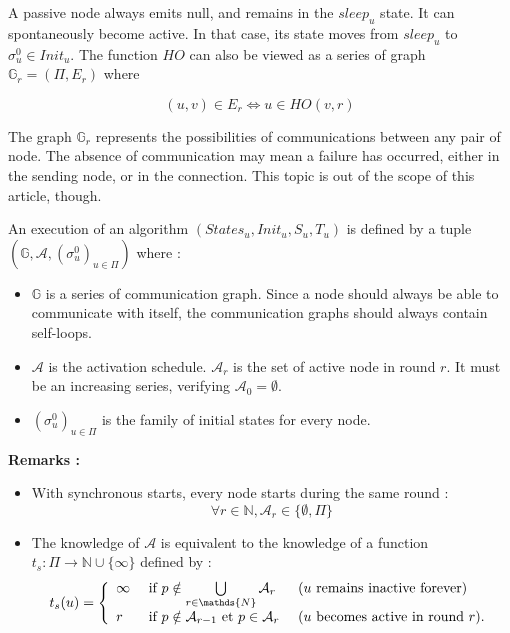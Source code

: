 \documentclass{article}
\newcommand{\ts}{t_{s}}
\begin{document}
A passive node always emits null, and remains in the $sleep_u$ state.
It can spontaneously become active. In that case, its state moves from $sleep_u$ to $\sigma^0_u \in Init_u$.
The function $HO$ can also be viewed as a series of graph $\mathds{G}_r = (\Pi, E_r)$ where

$$(u, v) \in E_r \Leftrightarrow u \in HO(v, r)$$

The graph $\mathds{G}_r$ represents the possibilities of communications between any pair of node.
The absence of communication may mean a failure has occurred, either in the sending node, or in the connection.
This topic is out of the scope of this article, though.

An execution of an algorithm $(States_u, Init_u, S_u, T_u)$ is defined by a tuple
$(\mathds{G}, \mathcal{A}, (\sigma^0_u)_{u \in \Pi})$ where :

\begin{itemize}
	\item $\mathds{G}$ is a series of communication graph. Since a node should always be able to communicate 
		with itself, the communication graphs should always contain self-loops.
	\item $\mathcal{A}$ is the activation schedule. $\mathcal{A}_r$ is the set of active node in round $r$.
		It must be an increasing series, verifying $\mathcal{A}_0 = \emptyset$.
	\item $(\sigma^0_u)_{u \in \Pi}$ is the family of initial states for every node.
\end{itemize}

\textbf{Remarks :}

\begin{itemize}
	\item With synchronous starts, every node starts during the same round : 
		$$\forall r \in \mathds{N}, \mathcal{A}_r \in \{\emptyset, \Pi\}$$

	\item The knowledge of $\mathcal{A}$ is equivalent to the knowledge of a function
		$\ts : \Pi \rightarrow \mathds{N} \cup \{\infty\}$ defined by :
		$$\ts(u) = \left \{ \begin{array}{l ll}
		  \infty & \mbox{ if  } p \notin \bigcup\limits_{r \in \mathds{N}}  \mathcal{A}_r & 
			  \mbox { ($u$ remains inactive forever) } \\
		  r  & \mbox{ if  } p \notin \mathcal{A}_{r-1} \mbox{ et } p \in \mathcal{A}_{r}  &
			  \mbox{ ($u$ becomes active in round $r$)}.
		  \end{array} \right.$$

\end{itemize}
\end{document}
